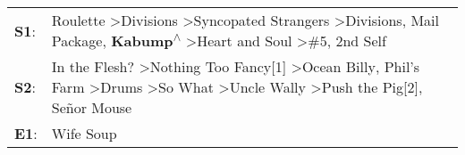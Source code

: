 \begin{supertabular}{p{0.03\textwidth}p{0.92\textwidth}}
 \textbf{S1}:  &            Roulette\textsuperscript{} \textgreater \enspace Divisions\textsuperscript{} \textgreater \enspace Syncopated Strangers\textsuperscript{} \textgreater \enspace Divisions\textsuperscript{}, \enspace Mail Package\textsuperscript{}, \enspace \textbf{Kabump\textsuperscript{$\wedge$}} \textgreater \enspace Heart and Soul\textsuperscript{} \textgreater \enspace \#5\textsuperscript{}, \enspace 2nd Self\textsuperscript{}  \enspace  \\
 \textbf{S2}:  &  In the Flesh?\textsuperscript{} \textgreater \enspace Nothing Too Fancy[1]\textsuperscript{} \textgreater \enspace Ocean Billy\textsuperscript{}, \enspace Phil's Farm\textsuperscript{} \textgreater \enspace Drums\textsuperscript{} \textgreater \enspace So What\textsuperscript{} \textgreater \enspace Uncle Wally\textsuperscript{} \textgreater \enspace Push the Pig[2]\textsuperscript{}, \enspace Señor Mouse\textsuperscript{}  \enspace  \\
 \textbf{E1}:  &                                                                                                                                                                                                                                                                                                                                                                                                                 Wife Soup\textsuperscript{}  \enspace  \\
\end{supertabular}
